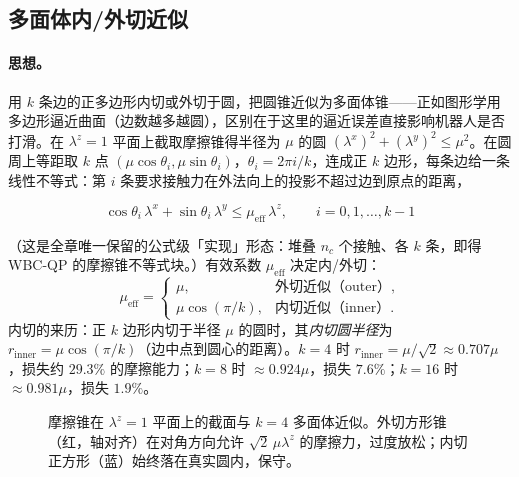 \subsection{多面体内/外切近似}
\label{subsec:polyhedral}

\paragraph{思想。}
用 $k$ 条边的正多边形内切或外切于圆，把圆锥近似为多面体锥——正如图形学用多边形逼近曲面（边数越多越圆），区别在于这里的逼近误差直接影响机器人是否打滑。在 $\lambda^z=1$ 平面上截取摩擦锥得半径为 $\mu$ 的圆 $(\lambda^x)^2+(\lambda^y)^2\le\mu^2$。在圆周上等距取 $k$ 点 $(\mu\cos\theta_i,\mu\sin\theta_i)$，$\theta_i=2\pi i/k$，连成正 $k$ 边形，每条边给一条线性不等式：第 $i$ 条要求接触力在外法向上的投影不超过边到原点的距离，

\begin{equation}
  \boxed{\ \cos\theta_i\,\lambda^x+\sin\theta_i\,\lambda^y\le\mu_{\mathrm{eff}}\,\lambda^z,\qquad i=0,1,\dots,k-1\ }
  \label{eq:cone-linear-ineq}
\end{equation}

\noindent（这是全章唯一保留的公式级「实现」形态：堆叠 $n_c$ 个接触、各 $k$ 条，即得 WBC-QP 的摩擦锥不等式块。）有效系数 $\mu_{\mathrm{eff}}$ 决定内/外切：
\begin{equation}
  \mu_{\mathrm{eff}}=\begin{cases} \mu, & \text{外切近似（outer）},\\[2pt] \mu\cos(\pi/k), & \text{内切近似（inner）}. \end{cases}
  \label{eq:mu-eff}
\end{equation}
内切的来历：正 $k$ 边形内切于半径 $\mu$ 的圆时，其\emph{内切圆半径}为 $r_{\mathrm{inner}}=\mu\cos(\pi/k)$（边中点到圆心的距离）。$k=4$ 时 $r_{\mathrm{inner}}=\mu/\sqrt2\approx0.707\mu$，损失约 $29.3\%$ 的摩擦能力；$k=8$ 时 $\approx0.924\mu$，损失 $7.6\%$；$k=16$ 时 $\approx0.981\mu$，损失 $1.9\%$。

\begin{figure}[ht]
\centering
{}
\caption{摩擦锥在 $\lambda^z=1$ 平面上的截面与 $k=4$ 多面体近似。外切方形锥（红，轴对齐）在对角方向允许 $\sqrt2\,\mu\lambda^z$ 的摩擦力，过度放松；内切正方形（蓝）始终落在真实圆内，保守。}
\label{fig:cone-cross-section}
\end{figure}

